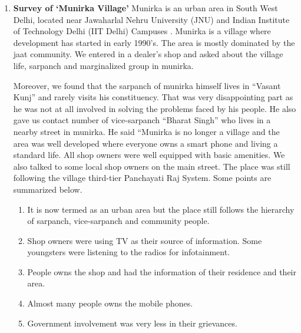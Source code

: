 \begin{enumerate}
\item \textbf {Survey of ‘Munirka Village’}
Munirka is an urban area in South West Delhi, located near Jawaharlal Nehru
University (JNU) and Indian Institute of Technology Delhi (IIT Delhi)
Campuses \cite{Munir91:online}. Munirka is a village where development has started in early 1990’s.
The area is mostly dominated by the jaat community. We entered in a dealer’s shop
and asked about the village life, sarpanch and marginalized group in munirka.

Moreover, we found that the sarpanch of munirka himself lives in “Vasant Kunj”
and rarely visits his constituency. That was very disappointing part as he was not
at all involved in solving the problems faced by his people. He also gave us contact
number of vice-sarpanch “Bharat Singh” who lives in a nearby street in munirka.
He said “Munirka is no longer a village and the area was well developed where
everyone owns a smart phone and living a standard life. All shop owners were well
equipped with basic amenities. We also talked to some local shop owners on the
main street. The place was still following the village third-tier Panchayati Raj
System. Some points are summarized below.

\begin{enumerate}
\item It is now termed as an urban area but the place still follows the hierarchy of
sarpanch, vice-sarpanch and community people.
\item Shop owners were using TV as their source of information. Some youngsters
were listening to the radios for infotainment.
\item People owns the shop and had the information of their residence and their
area.
\item Almost many people owns the mobile phones.
\item Government involvement was very less in their grievances.
\end{enumerate}


\end{enumerate}

